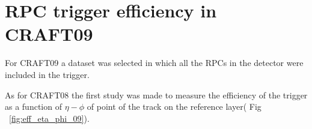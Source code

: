 




\section{RPC trigger efficiency in CRAFT09}

For CRAFT09 a dataset was selected in which all the RPCs
 in the detector were included in the trigger. 

As for CRAFT08 the first study was made to 
measure the efficiency of the trigger as a function of $\eta - \phi$
of point of the track on the  reference layer( Fig ~\ref{fig:eff_eta_phi_09}). 


